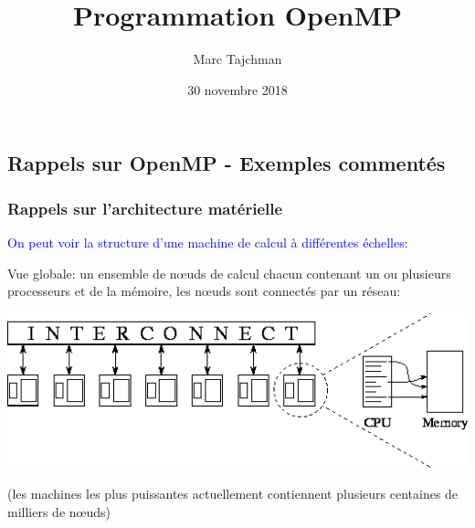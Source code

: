 \documentclass{beamer}
\title{Programmation OpenMP}
\author{Marc Tajchman}\institute{CEA - DEN/DM2S/STMF/LMES}
\date{30 novembre 2018}
\begin{document}
\begin{frame}
\titlepage
\end{frame}

\Large
\begin{frame}
  	\tableofcontents
\end{frame}

\begin{frame}
\section{Rappels sur OpenMP - Exemples commentés}
\frametitle{Rappels sur l'architecture mat\'erielle}
\textcolor{blue}{On peut voir la structure d'une machine de calcul \`a diff\'erentes \'echelles}:
\vfill

Vue globale: un ensemble de n\oe uds de calcul chacun contenant un ou plusieurs processeurs et de la m\'emoire, les n\oe uds sont connect\'es par un r\'eseau:

\vfill
\begin{center}
\includegraphics[scale=0.4]{../Images/img100}
\end{center}

(les machines les plus puissantes actuellement contiennent plusieurs centaines de milliers de n\oe uds)
\end{frame}
\end{document}
